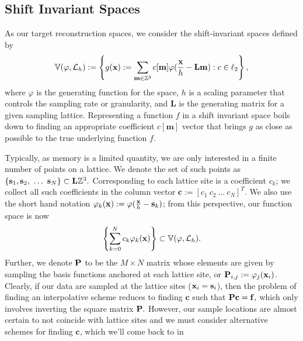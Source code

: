 \subsection{Shift Invariant Spaces} \label{sec:sis_review}
As our target reconstruction spaces, we consider the shift-invariant spaces defined by {\small 
\begin{equation*}
	\mathbb{V}(\varphi,  \mathcal{L}_h) := \left\{ g(\mathbf{x}) := \displaystyle\sum_{\mathbf{m} \in \mathbb{Z}^3} c[\mathbf{m}]\varphi(\frac{\mathbf{x}}{h} - \mathbf{Lm}) : c \in \ell_2 \right\},
\end{equation*}}
where $\varphi$ is the generating function for the space, $h$ is a scaling parameter that controls the sampling rate or granularity, and $\mathbf{L}$ is the generating matrix for a given sampling lattice. Representing a function $f$ in a shift invariant space boils down to finding an appropriate coefficient $c[\mathbf{m}]$ vector that brings $g$ as close as possible to the true underlying function $f$. 

Typically, as memory is a limited quantity, we are only interested in a finite number of points on a lattice. We denote the set of such points as $\{\mathbf{s}_1,\mathbf{s}_2,\ \hdots  \ \mathbf{s}_N\} \subset \mathbf{L}\intn^3.$ Corresponding to each lattice site is a coefficient $c_k$; we collect all such coefficients in the column vector $\mathbf{c}:=\left[c_1 \ c_2 \ \hdots \ c_N \right]^T.$ We also use the short hand notation $\varphi_k(\mathbf{x}) := \varphi(\frac{\mathbf{x}}{h}-\mathbf{s}_k)$; from this perspective, our function space is now {\small 
\begin{equation}
	\left\{ \displaystyle\sum_{k=0}^N c_k \varphi_k(\mathbf{x}) \right\} \subset \mathbb{V}(\varphi, \mathcal{L}_h).
\end{equation}}
Further, we denote $\mathbf{\mathbf{P}}$ to be the $M \times N$ matrix whose elements are given by sampling the basis functions anchored at each lattice site, or $\mathbf{P}_{i,j} := \varphi_j(\mathbf{x}_i)$. Clearly, if our data are sampled at the lattice sites ($\mathbf{x}_i = \mathbf{s}_i$), then the problem of finding an interpolative scheme reduces to finding $\mathbf{c}$ such that $\mathbf{\mathbf{P} c=f},$ which only involves inverting the square matrix $\mathbf{\mathbf{P}}.$ However, our sample locations are almost certain to not coincide with lattice sites and we must consider alternative schemes for finding $\mathbf{c}$, which we'll come back to in 

